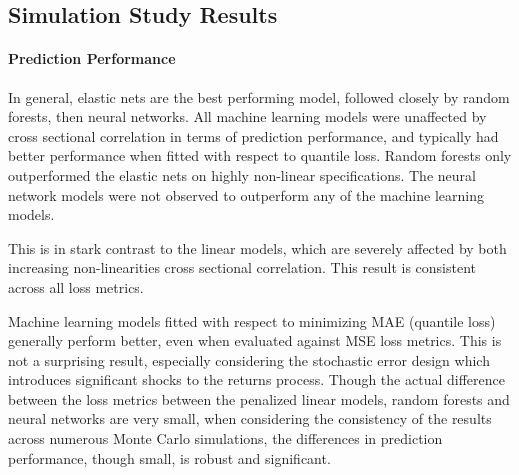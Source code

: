 \documentclass{article}
\begin{document}
\subsection{Simulation Study Results}

\paragraph{Prediction Performance}
In general, elastic nets are the best performing model, followed closely by random forests, then neural networks. All machine learning models were unaffected by cross sectional correlation in terms of prediction performance, and typically had better performance when fitted with respect to quantile loss. Random forests only outperformed the elastic nets on highly non-linear specifications. The neural network models were not observed to outperform any of the machine learning models. 

This is in stark contrast to the linear models, which are severely affected by both increasing non-linearities cross sectional correlation. This result is consistent across all loss metrics.

Machine learning models fitted with respect to minimizing MAE (quantile loss) generally perform better, even when evaluated against MSE loss metrics. This is not a surprising result, especially considering the stochastic error design which introduces significant shocks to the returns process. Though the actual difference between the loss metrics between the penalized linear models, random forests and neural networks are very small, when considering the consistency of the results across numerous Monte Carlo simulations, the differences in prediction performance, though small, is robust and significant.


\end{document}
